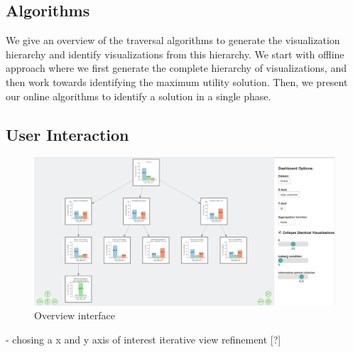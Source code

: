\subsection{Algorithms}
We give an overview of the traversal algorithms to generate the visualization hierarchy and identify visualizations from this hierarchy. We start with offline approach where we first generate the complete hierarchy of visualizations, and then work towards identifying the maximum utility solution. Then, we present our online algorithms to identify a solution in a single phase. 


\subsection{User Interaction}
\begin{figure}[ht!]
\label{overview}
\centering
\includegraphics[width=\linewidth]{figures/overview2.jpeg}
\caption{Overview interface}
\end{figure}
- chosing a x and y axis of interest 
iterative view refinement [?]
